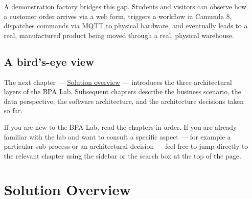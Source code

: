 \documentclass[
  english,
  11pt,
  a4paper,
]{scrbook}
\begin{document}
A demonstration factory bridges this gap. Students and visitors can
observe how a customer order arrives via a web form, triggers a workflow
in Camunda 8, dispatches commands via MQTT to physical hardware, and
eventually leads to a real, manufactured product being moved through a
real, physical warehouse.

\section{A bird's-eye view}\label{a-birds-eye-view}

The next chapter --- \href{chapter02-solution-overview.qmd}{Solution
overview} --- introduces the three architectural layers of the BPA Lab.
Subsequent chapters describe the business scenario, the data
perspective, the software architecture, and the architecture decisions
taken so far.

\begin{tcolorbox}[enhanced jigsaw, arc=.35mm, bottomrule=.15mm, bottomtitle=1mm, breakable, colback=white, colbacktitle=quarto-callout-tip-color!10!white, colframe=quarto-callout-tip-color-frame, coltitle=black, left=2mm, leftrule=.75mm, opacityback=0, opacitybacktitle=0.6, rightrule=.15mm, title=\textcolor{quarto-callout-tip-color}{\faLightbulb}\hspace{0.5em}{How to read this book}, titlerule=0mm, toprule=.15mm, toptitle=1mm]

If you are new to the BPA Lab, read the chapters in order. If you are
already familiar with the lab and want to consult a specific aspect ---
for example a particular sub-process or an architectural decision ---
feel free to jump directly to the relevant chapter using the sidebar or
the search box at the top of the page.

\end{tcolorbox}


\chapter{Solution Overview}\label{solution-overview}
\end{document}
